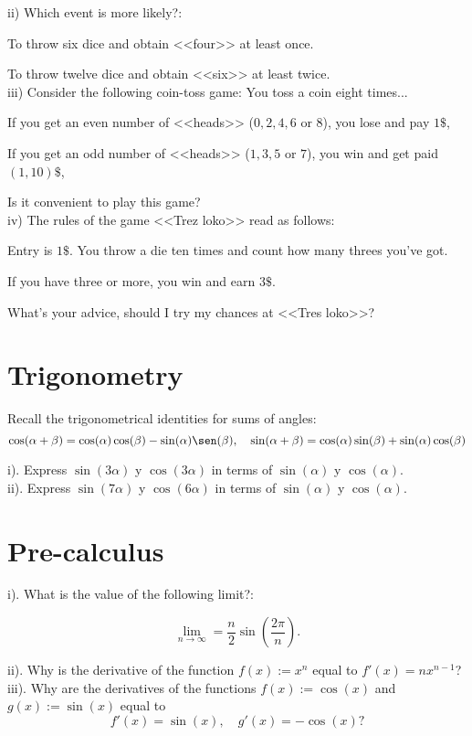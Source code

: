 
ii) Which event is more likely?: 

To throw six dice and obtain <<four>> at least once.

To throw twelve dice and obtain <<six>> at least twice.\\

iii) Consider the following coin-toss game: You toss a coin eight times...

If you get an even number of <<heads>> ($0,2,4,6$ or $8$), you lose and pay $1\$ $, 

If you get an odd number of <<heads>> ($1,3,5$ or $7$), you win and get paid $(1,10)\$$, 

Is it convenient to play this game?\\

iv) The rules of the game <<Trez loko>> read as follows:

Entry is $1\$$. You throw a die ten times and count how many threes you've got. 

If you have three or more, you win and earn $3\$$.

What's your advice, should I try my chances at <<Tres loko>>?

\section*{Trigonometry}

Recall the trigonometrical identities for sums of angles:
$$\cos(\alpha+\beta)=\cos(\alpha)\cos(\beta)-\sin(\alpha)\sen(\beta), \quad \sin(\alpha+\beta)=\cos(\alpha)\sin(\beta)+\sin(\alpha)\cos(\beta)$$

i). Express $\sin(3\alpha)$ y $\cos(3\alpha)$ in terms of $\sin(\alpha)$ y $\cos(\alpha)$.\\

ii). Express $\sin(7\alpha)$ y $\cos(6\alpha)$ in terms of $\sin(\alpha)$ y $\cos(\alpha)$.


\section*{Pre-calculus}

i). What is the value of the following limit?:

$$\lim_{n\to\infty}=\frac{n}{2}\sin\left(\frac{2 \pi}{n} \right).$$


ii). Why is the derivative of the function $f(x):=x^n$ equal to $f'(x)=nx^{n-1}$?\\


iii). Why are the derivatives of the functions $f(x):=\cos(x)$ and $g(x):=\sin(x)$ equal to $$f'(x)=\sin(x),\quad g'(x)=-\cos(x)?$$
